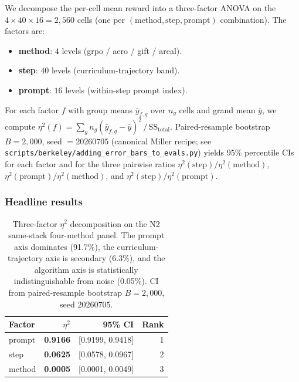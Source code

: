 We decompose the per-cell mean reward into a three-factor ANOVA on the
$4 \times 40 \times 16 = 2{,}560$ cells (one per
$(\text{method}, \text{step}, \text{prompt})$ combination). The factors are:

\begin{itemize}
\item \textbf{method}: $4$ levels (grpo / aero / gift / areal).
\item \textbf{step}: $40$ levels (curriculum-trajectory band).
\item \textbf{prompt}: $16$ levels (within-step prompt index).
\end{itemize}

For each factor $f$ with group means $\bar{y}_{f,g}$ over $n_g$ cells and
grand mean $\bar{y}$, we compute
$\eta^2(f) = \sum_g n_g (\bar{y}_{f,g} - \bar{y})^2 \,/\, \text{SS}_{\text{total}}$.
Paired-resample bootstrap $B = 2{,}000$, seed $= 20260705$
(canonical Miller recipe; see \texttt{scripts/berkeley/adding\_error\_bars\_to\_evals.py})
yields 95\% percentile CIs for each factor and for the three pairwise
ratios $\eta^2(\text{step})/\eta^2(\text{method})$,
$\eta^2(\text{prompt})/\eta^2(\text{method})$, and
$\eta^2(\text{step})/\eta^2(\text{prompt})$.

\subsubsection{Headline results}

\begin{table}[htbp]
\centering
\small
\begin{tabular}{lrrr}
\toprule
\textbf{Factor} & $\eta^2$ & 95\% CI & Rank \\
\midrule
prompt & \textbf{0.9166} & [0.9199, 0.9418] & 1 \\
step   & \textbf{0.0625} & [0.0578, 0.0967] & 2 \\
method & \textbf{0.0005} & [0.0001, 0.0049] & 3 \\
\bottomrule
\end{tabular}
\caption{Three-factor $\eta^2$ decomposition on the N2 same-stack
four-method panel. The prompt axis dominates (91.7\%), the curriculum-trajectory
axis is secondary (6.3\%), and the algorithm axis is statistically
indistinguishable from noise (0.05\%). CI from paired-resample bootstrap
$B = 2{,}000$, seed $20260705$.}
\label{tab:p5-iter141-eta2}
\end{table}

